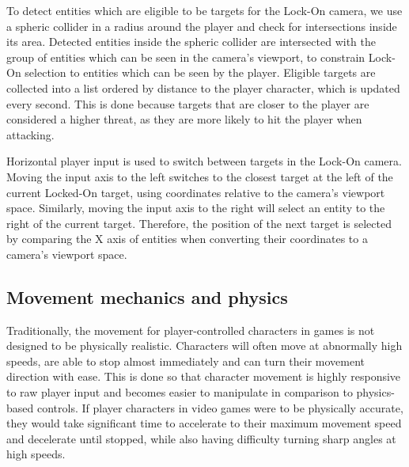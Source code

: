 To detect entities which are eligible to be targets for the Lock-On camera, we use a spheric collider in a radius around the player and check for intersections inside its area. Detected entities inside the spheric collider are intersected with the group of entities which can be seen in the camera's viewport, to constrain Lock-On selection to entities which can be seen by the player. Eligible targets are collected into a list ordered by distance to the player character, which is updated every second. This is done because targets that are closer to the player are considered a higher threat, as they are more likely to hit the player when attacking.

Horizontal player input is used to switch between targets in the Lock-On camera. Moving the input axis to the left switches to the closest target at the left of the current Locked-On target, using coordinates relative to the camera's viewport space. Similarly, moving the input axis to the right will select an entity to the right of the current target. Therefore, the position of the next target is selected by comparing the X axis of entities when converting their coordinates to a camera's viewport space.



\subsection{Movement mechanics and physics}

Traditionally, the movement for player-controlled characters in games is not designed to be physically realistic. Characters will often move at abnormally high speeds, are able to stop almost immediately and can turn their movement direction with ease. This is done so that character movement is highly responsive to raw player input and becomes easier to manipulate in comparison to physics-based controls. If player characters in video games were to be physically accurate, they would take significant time to accelerate to their maximum movement speed and decelerate until stopped, while also having difficulty turning sharp angles at high speeds.

